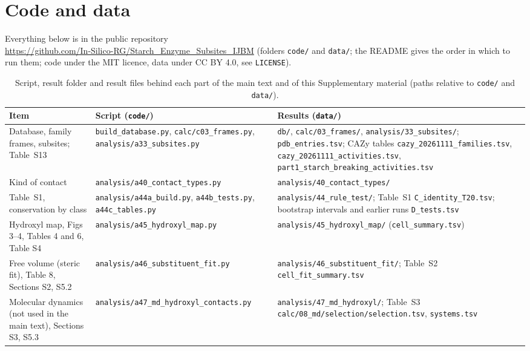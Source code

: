 \documentclass[preprint,12pt]{elsarticle}
\begin{document}
\clearpage
\section{Code and data}\label{sec:codedata}
Everything below is in the public repository\\ \url{https://github.com/In-Silico-RG/Starch_Enzyme_Subsites_IJBM}
(folders \texttt{code/} and \texttt{data/}; the README gives the order in which to run them; code under the MIT
licence, data under CC BY 4.0, see \texttt{LICENSE}).

\begin{table}[h]\centering\scriptsize\setlength{\tabcolsep}{3pt}\renewcommand{\_}{\textunderscore\allowbreak{}}
\caption{Script, result folder and result files behind each part of the main text and of this Supplementary
material (paths relative to \texttt{code/} and \texttt{data/}).}
\begin{tabular}{>{\raggedright\arraybackslash}p{3.3cm}>{\raggedright\arraybackslash}p{3.5cm}>{\raggedright\arraybackslash}p{4.9cm}}
\toprule
Item & Script (\texttt{code/}) & Results (\texttt{data/}) \\
\midrule
Database, family frames, subsites; Table~S13 & \texttt{build\_database.py}, \texttt{calc/c03\_frames.py}, \texttt{analysis/}\allowbreak\texttt{a33\_subsites.py} & \texttt{db/}, \texttt{calc/03\_frames/}, \texttt{analysis/33\_subsites/}; \texttt{pdb\_entries.tsv}; CAZy tables \texttt{cazy\_20261111\_families.tsv}, \texttt{cazy\_20261111\_activities.tsv}, \texttt{part1\_starch\_}\allowbreak\texttt{breaking\_activities.tsv} \\
Kind of contact & \texttt{analysis/a40\_contact\_types.py} & \texttt{analysis/40\_contact\_types/} \\
Table~S1, conservation by class & \texttt{analysis/a44a\_build.py}, \texttt{a44b\_tests.py}, \texttt{a44c\_tables.py} & \texttt{analysis/44\_rule\_test/}; Table~S1 \texttt{C\_identity\_T20.tsv}; bootstrap intervals and earlier runs \texttt{D\_tests.tsv} \\
Hydroxyl map, Figs 3--4, Tables 4 and 6, Table S4 & \texttt{analysis/a45\_hydroxyl\_map.py} & \texttt{analysis/45\_hydroxyl\_map/} (\texttt{cell\_summary.tsv}) \\
Free volume (steric fit), Table 8, Sections S2, S5.2 & \texttt{analysis/a46\_substituent\_fit.py} & \texttt{analysis/46\_substituent\_fit/}; Table~S2 \texttt{cell\_fit\_summary.tsv} \\
Molecular dynamics (not used in the main text), Sections S3, S5.3 & \texttt{analysis/}\allowbreak\texttt{a47\_md\_hydroxyl\_contacts.py} & \texttt{analysis/47\_md\_hydroxyl/}; Table~S3 \texttt{calc/08\_md/selection/}\allowbreak\texttt{selection.tsv}, \texttt{systems.tsv} \\

\end{tabular}
\end{table}
\end{document}
